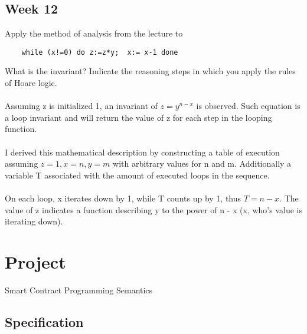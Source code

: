 \documentclass{article}
\theoremstyle{theorem}
\theoremstyle{definition}
\theoremstyle{remark}
\begin{document}
\subsection{Week 12}
Apply the method of analysis from the lecture to
\begin{verbatim}
    while (x!=0) do z:=z*y;  x:= x-1 done
\end{verbatim}

What is the invariant? Indicate the reasoning steps in which you apply the rules of Hoare logic.
\\\\
Assuming z is initialized 1, an invariant of $z=y^{n-x}$ is observed. Such equation is a loop invariant and will return the value of z for each step in the looping function. 
\\\\
I derived this mathematical description by constructing a table of execution assuming $z = 1, x = n, y = m$ with arbitrary values for n and m. Additionally a variable T associated with the amount of executed loops in the sequence.
\\\\
On each loop, x iterates down by 1, while T counts up by 1, thus $T = n - x$. The value of z indicates a function describing y to the power of n - x (x, who's value is iterating down). 





\section{Project}

Smart Contract Programming Semantics

\subsection{Specification}

    
\end{document}
